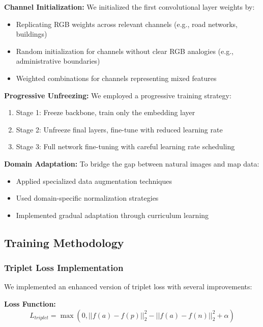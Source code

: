 \textbf{Channel Initialization:} We initialized the first convolutional layer weights by:
\begin{itemize}
    \item Replicating RGB weights across relevant channels (e.g., road networks, buildings)
    \item Random initialization for channels without clear RGB analogies (e.g., administrative boundaries)
    \item Weighted combinations for channels representing mixed features
\end{itemize}

\textbf{Progressive Unfreezing:} We employed a progressive training strategy:
\begin{enumerate}
    \item Stage 1: Freeze backbone, train only the embedding layer
    \item Stage 2: Unfreeze final layers, fine-tune with reduced learning rate
    \item Stage 3: Full network fine-tuning with careful learning rate scheduling
\end{enumerate}

\textbf{Domain Adaptation:} To bridge the gap between natural images and map data:
\begin{itemize}
    \item Applied specialized data augmentation techniques
    \item Used domain-specific normalization strategies
    \item Implemented gradual adaptation through curriculum learning
\end{itemize}

\subsection{Training Methodology}

\subsubsection{Triplet Loss Implementation}

We implemented an enhanced version of triplet loss with several improvements:

\textbf{Loss Function:}
\begin{equation}
L_{triplet} = \max(0, ||f(a) - f(p)||_2^2 - ||f(a) - f(n)||_2^2 + \alpha)
\end{equation}

